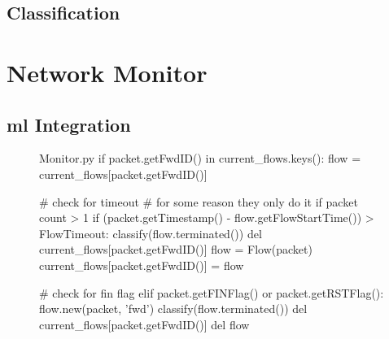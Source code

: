 
\subsection{Classification}
\label{subsec:classification}

\textcolor{dimgray}{\lipsum[1]}


\section{Network Monitor}
\label{sec:monitor-implementation}

\textcolor{dimgray}{\lipsum[1]}


\subsection{\gls{ml} Integration}
\label{subsec:ml-integration}

\textcolor{dimgray}{\lipsum[1]}

\begin{figure}
    \begin{code}[colback=white]{Monitor.py}
if packet.getFwdID() in current_flows.keys():
flow = current_flows[packet.getFwdID()]

# check for timeout
# for some reason they only do it if packet count > 1
if (packet.getTimestamp() - flow.getFlowStartTime()) > FlowTimeout:
    classify(flow.terminated())
    del current_flows[packet.getFwdID()]
    flow = Flow(packet)
    current_flows[packet.getFwdID()] = flow

# check for fin flag
elif packet.getFINFlag() or packet.getRSTFlag():
    flow.new(packet, 'fwd')
    classify(flow.terminated())
    del current_flows[packet.getFwdID()]
    del flow
\end{code}
\end{figure}

\textcolor{dimgray}{\lipsum[1]}


